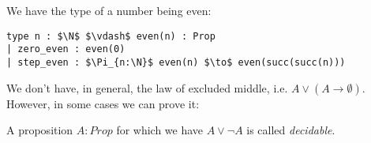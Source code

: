 \documentclass[a4paper, 12pt]{article}
\newcommand{\N}{\mathbb{N}}
\newcommand{\B}{\mathbb{B}}
\newcommand{\Prop}{\mathit{Prop}}
\renewcommand{\Prop}{\mathit{Prop}}
\newcommand{\la}[1]{\lambda{#1}.\,}
\theoremstyle{changedot}
\theoremstyle{changedotbreak}
\theoremstyle{nonumberplain}
\newtheorem{proof}{Proof}
\begin{document}
\begin{definition}
  We have the type of a number being even:
\begin{lstlisting}
type n : $\N$ $\vdash$ even(n) : Prop
| zero_even : even(0)
| step_even : $\Pi_{n:\N}$ even(n) $\to$ even(succ(succ(n)))
\end{lstlisting}
\end{definition}

We don't have, in general, the law of excluded middle, i.e. $A \lor (A \to \emptyset)$. However, in some cases we can prove it:
\begin{definition}
  A proposition $A : \Prop$ for which we have $A \lor \neg A$ is called \textit{decidable}.
\end{definition}


\end{document}
